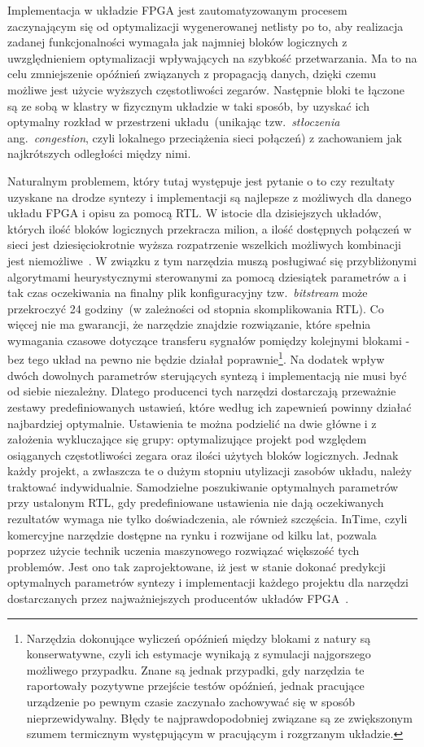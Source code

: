 Implementacja w układzie FPGA jest zautomatyzowanym procesem zaczynającym się od optymalizacji wygenerowanej netlisty po to, aby realizacja zadanej funkcjonalności wymagała jak najmniej bloków logicznych z uwzględnieniem optymalizacji wpływających na szybkość przetwarzania. Ma to na celu zmniejszenie opóźnień związanych z propagacją danych, dzięki czemu możliwe jest użycie wyższych częstotliwości zegarów. Następnie bloki te łączone są ze sobą w klastry w fizycznym układzie w taki sposób, by uzyskać ich optymalny rozkład w przestrzeni układu~(unikając tzw.~\textit{stłoczenia}~ ang.~\textit{congestion}, czyli lokalnego przeciążenia sieci połączeń) z zachowaniem jak najkrótszych odległości między nimi. 

Naturalnym problemem, który tutaj występuje jest pytanie o to czy rezultaty uzyskane na drodze syntezy i implementacji są najlepsze z możliwych dla danego układu FPGA i opisu za pomocą RTL. W istocie dla dzisiejszych układów, których ilość bloków logicznych przekracza milion, a ilość dostępnych połączeń w sieci jest dziesięciokrotnie wyższa rozpatrzenie wszelkich możliwych kombinacji jest niemożliwe~\cite{FPGA_SD}. W związku z tym narzędzia muszą posługiwać się przybliżonymi algorytmami heurystycznymi sterowanymi za pomocą dziesiątek parametrów a i tak czas oczekiwania na finalny plik konfiguracyjny tzw.~\textit{bitstream} może przekroczyć 24 godziny~(w zależności od stopnia skomplikowania RTL). Co więcej nie ma gwarancji, że narzędzie znajdzie rozwiązanie, które spełnia wymagania czasowe dotyczące transferu sygnałów pomiędzy kolejnymi blokami - bez tego układ na pewno nie będzie działał poprawnie\footnote{Narzędzia dokonujące wyliczeń opóźnień między blokami z natury są konserwatywne, czyli ich estymacje wynikają z symulacji najgorszego możliwego przypadku. Znane są jednak przypadki, gdy narzędzia te raportowały pozytywne przejście testów opóźnień, jednak pracujące urządzenie po pewnym czasie zaczynało zachowywać się w sposób nieprzewidywalny. Błędy te najprawdopodobniej związane są ze zwiększonym szumem termicznym występującym w pracującym i rozgrzanym układzie. }. Na dodatek wpływ dwóch dowolnych parametrów sterujących syntezą i implementacją nie musi być od siebie niezależny. Dlatego producenci tych narzędzi dostarczają przeważnie zestawy predefiniowanych ustawień, które według ich zapewnień powinny działać najbardziej optymalnie. Ustawienia te można podzielić na dwie główne i z założenia wykluczające się grupy: optymalizujące projekt pod względem osiąganych częstotliwości zegara oraz ilości użytych bloków logicznych. Jednak każdy projekt, a zwłaszcza te o dużym stopniu utylizacji zasobów układu, należy traktować indywidualnie. Samodzielne poszukiwanie optymalnych parametrów przy ustalonym RTL, gdy predefiniowane ustawienia nie dają oczekiwanych rezultatów wymaga nie tylko doświadczenia, ale również szczęścia. InTime, czyli komercyjne narzędzie dostępne na rynku i rozwijane od kilku lat, pozwala poprzez użycie technik uczenia maszynowego rozwiązać większość tych problemów. Jest ono tak zaprojektowane, iż jest w stanie dokonać predykcji optymalnych parametrów syntezy i implementacji każdego projektu dla narzędzi dostarczanych przez najważniejszych producentów układów FPGA~\cite{InTime1}\cite{InTime2}\cite{InTime3}. 


